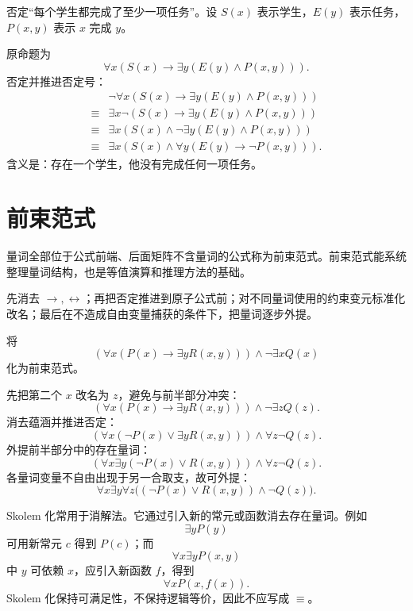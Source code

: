 \begin{example}[title={量词否定}]\label{ch2-negation-example}
否定“每个学生都完成了至少一项任务”。设 $S(x)$ 表示学生，$E(y)$ 表示任务，$P(x,y)$ 表示 $x$ 完成 $y$。
\begin{solution}
原命题为
\[
\forall x(S(x)\to\exists y(E(y)\land P(x,y))).
\]
否定并推进否定号：
\[
\begin{aligned}
&\neg\forall x(S(x)\to\exists y(E(y)\land P(x,y)))\\
\equiv{}&\exists x\neg(S(x)\to\exists y(E(y)\land P(x,y)))\\
\equiv{}&\exists x(S(x)\land\neg\exists y(E(y)\land P(x,y)))\\
\equiv{}&\exists x(S(x)\land\forall y(E(y)\to\neg P(x,y))).
\end{aligned}
\]
含义是：存在一个学生，他没有完成任何一项任务。
\end{solution}
\end{example}

\section{前束范式}

量词全部位于公式前端、后面矩阵不含量词的公式称为前束范式。前束范式能系统整理量词结构，也是等值演算和推理方法的基础。

\begin{method}[化前束范式]\label{ch2-prenex-method}
先消去 $\to,\leftrightarrow$；再把否定推进到原子公式前；对不同量词使用的约束变元标准化改名；最后在不造成自由变量捕获的条件下，把量词逐步外提。
\end{method}

\begin{example}[title={前束范式转换}]\label{ch2-prenex-example}
将
\[
(\forall x(P(x)\to\exists yR(x,y)))\land\neg\exists xQ(x)
\]
化为前束范式。
\begin{solution}
先把第二个 $x$ 改名为 $z$，避免与前半部分冲突：
\[
(\forall x(P(x)\to\exists yR(x,y)))\land\neg\exists zQ(z).
\]
消去蕴涵并推进否定：
\[
(\forall x(\neg P(x)\lor\exists yR(x,y)))\land\forall z\neg Q(z).
\]
外提前半部分中的存在量词：
\[
(\forall x\exists y(\neg P(x)\lor R(x,y)))\land\forall z\neg Q(z).
\]
各量词变量不自由出现于另一合取支，故可外提：
\[
\forall x\exists y\forall z\bigl((\neg P(x)\lor R(x,y))\land\neg Q(z)\bigr).
\]
\end{solution}
\end{example}

Skolem 化常用于消解法。它通过引入新的常元或函数消去存在量词。例如
\[
\exists yP(y)
\]
可用新常元 $c$ 得到 $P(c)$；而
\[
\forall x\exists yP(x,y)
\]
中 $y$ 可依赖 $x$，应引入新函数 $f$，得到
\[
\forall xP(x,f(x)).
\]
Skolem 化保持可满足性，不保持逻辑等价，因此不应写成 $\equiv$。

